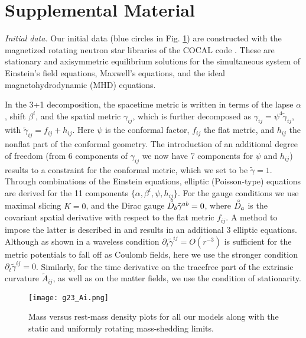 \documentclass[twocolumn,superscriptaddress,showpacs,prl,aps,amsmath,amssymb,nofootinbib]{revtex4-1}
\newcommand{\GA}{\alpha}
\newcommand{\GB}{\beta}
\newcommand{\GG}{\gamma}
\newcommand{\GC}{\psi}
\newcommand{\pd}{\partial}
\newcommand{\TUU}[3]{\tilde{#1}^{#2 #3}}
\newcommand{\TDD}[3]{\tilde{#1}_{#2 #3}}
\newcommand{\zD}{{\raise1.0ex\hbox{${}^{\ \circ}$}}\!\!\!\!\!D}
\begin{document}
\appendix

\section{Supplemental Material}

\textit{Initial data.}\textemdash 
Our initial data (blue circles in Fig. \ref{fig:Mrho})
are constructed with the magnetized rotating neutron star
libraries of the \textsc{COCAL} code \cite{Uryu:2014tda,Uryu:2019ckz}.  These
are stationary and axisymmetric equilibrium solutions for the simultaneous
system of Einstein's field equations, Maxwell's equations, and the ideal
magnetohydrodynamic (MHD) equations.

In the 3+1 decomposition, the spacetime metric is written in terms of the lapse
$\GA$, shift $\GB^i$, and the spatial metric $\GG_{ij}$, which is further
decomposed as $\GG_{ij}=\GC^4 \TDD{\GG}{i}{j}$, with
$\TDD{\GG}{i}{j}=f_{ij}+h_{ij}$.  Here $\GC$ is the conformal factor, $f_{ij}$
the flat metric, and $h_{ij}$ the nonflat part of the conformal geometry.  The
introduction of an additional degree of freedom (from 6 components of
$\GG_{ij}$ we now have 7 components for $\GC$ and $h_{ij}$) results to a
constraint for the conformal metric, which we set to be $\tilde{\GG}=1$.
Through combinations of the Einstein equations,  elliptic (Poisson-type)
equations are derived for the 11 components $\{\GA,\GB^i,\GC,h_{ij}\}$.  For
the gauge conditions we use maximal slicing $K=0$, and the Dirac gauge
$\zD_b\TUU{\GG}{a}{b}=0$, where $\zD_a$ is the covariant spatial derivative with
respect to the flat metric $f_{ij}$. A method to impose the latter is described
in \cite{Uryu:2009ye,Uryu:2019ckz} and results in an additional 3 elliptic
equations. Although as shown in \cite{Shibata:2004qz} a waveless condition
$\pd_t \TUU{\GG}{i}{j}=O(r^{-3})$ is sufficient for the metric potentials to
fall off as Coulomb fields, here we use the stronger condition $\pd_t
\TUU{\GG}{i}{j}=0$. Similarly, for the time derivative on the tracefree part of
the extrinsic curvature $\TDD{A}{i}{j}$, as well as on the matter fields, we
use the condition of stationarity. 

\begin{figure} 
\begin{center}
\texttt{[image: g23\_Ai.png]}
\caption{Mass versus rest-mass density plots for all our models along with the static and 
uniformly rotating mass-shedding limits. }
\label{fig:Mrho}
\end{center}
\end{figure}
\end{document}
